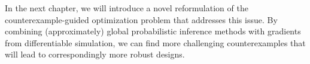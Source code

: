In the next chapter, we will introduce a novel reformulation of the counterexample-guided optimization problem that addresses this issue. By combining (approximately) global probabilistic inference methods with gradients from differentiable simulation, we can find more challenging counterexamples that will lead to correspondingly more robust designs.